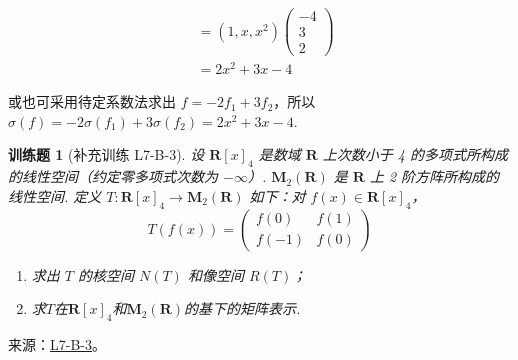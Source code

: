 \documentclass[12pt,fontset=fandol]{ctexart}
\newtheorem{exercise}{训练题}[section]
\begin{document}
\begin{solve}
\begin{enumerate}
\begin{align*}
                                    & = (1, x, x^2)
                          \begin{pmatrix} -4 \\ 3 \\ 2 \end{pmatrix}                          \\
                                    & = 2x^2 + 3x - 4
                      \end{align*}

                      或也可采用待定系数法求出 $ f = -2 f_1 + 3 f_2 $，所以 $ \sigma(f) = -2 \sigma(f_1) + 3 \sigma(f_2) = 2x^2 + 3x - 4 $.
            \end{enumerate}
\end{solve}

\begin{exercise}[补充训练 L7-B-3]\label{prob:L7-B-3}
设 $\mathbf{R}[x]_4$ 是数域 $\mathbf{R}$ 上次数小于 4 的多项式所构成的线性空间（约定零多项式次数为 $-\infty$）. $\mathbf{M}_2(\mathbf{R})$ 是 $\mathbf{R}$ 上 2 阶方阵所构成的线性空间. 定义 $T \colon \mathbf{R}[x]_4 \to \mathbf{M}_2(\mathbf{R})$ 如下：对 $f(x) \in \mathbf{R}[x]_4$，
        \[T(f(x))=\begin{pmatrix}f(0) & f(1) \\ f(-1) & f(0)\end{pmatrix}\]
        \begin{enumerate}
            \item 求出 $T$ 的核空间 $N(T)$ 和像空间 $R(T)$；

            \item 求$T$在$\mathbf{R}[x]_4$和$\mathbf{M}_2(\mathbf{R})$的基下的矩阵表示.
        \end{enumerate}
\end{exercise}
\noindent 来源：\href{https://github.com/yhwu-is/Linear-Algebra-Left-Undone/blob/new/%E8%AE%B2%E4%B9%89/%E4%B8%93%E9%A2%98/7%20%E7%BA%BF%E6%80%A7%E6%98%A0%E5%B0%84%E7%9F%A9%E9%98%B5%E8%A1%A8%E7%A4%BA%E4%B8%8E%E7%9F%A9%E9%98%B5%E8%BF%90%E7%AE%97%E5%9F%BA%E7%A1%80.tex}{L7-B-3}。
\end{document}

